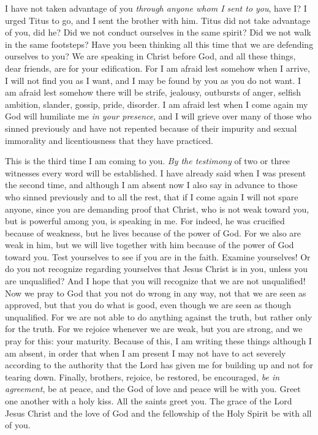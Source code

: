 \begin{biblechapter}
\verse I have not taken advantage of you \textit{through anyone whom I sent to you}, have I?
\verse I urged Titus to go, and I sent the brother with him. Titus did not take advantage of you, did he? Did we not conduct ourselves in the same spirit? Did we not walk in the same footsteps?
\verse Have you been thinking all this time that we are defending ourselves to you? We are speaking in Christ before God, and all these things, dear friends, are for your edification.
\verse For I am afraid lest somehow when I arrive, I will not find you as I want, and I may be found by you as you do not want. I am afraid lest somehow there will be strife, jealousy, outbursts of anger, selfish ambition, slander, gossip, pride, disorder.
\verse I am afraid lest when I come again my God will humiliate me \textit{in your presence}, and I will grieve over many of those who sinned previously and have not repented because of their impurity and sexual immorality and licentiousness that they have practiced.
\end{biblechapter}

\begin{biblechapter} %
 This is the third time I am coming to you. \textit{By the testimony} of two or three witnesses every word will be established.
\verse I have already said when I was present the second time, and although I am absent now I also say in advance to those who sinned previously and to all the rest, that if I come again I will not spare anyone,
\verse since you are demanding proof that Christ, who is not weak toward you, but is powerful among you, is speaking in me.
\verse For indeed, he was crucified because of weakness, but he lives because of the power of God. For we also are weak in him, but we will live together with him because of the power of God toward you.
\verse Test yourselves to see if you are in the faith. Examine yourselves! Or do you not recognize regarding yourselves that Jesus Christ is in you, unless you are unqualified?
\verse And I hope that you will recognize that we are not unqualified!
\verse Now we pray to God that you not do wrong in any way, not that we are seen as approved, but that you do what is good, even though we are seen as though unqualified.
\verse For we are not able to do anything against the truth, but rather only for the truth.
\verse For we rejoice whenever we are weak, but you are strong, and we pray for this: your maturity.
\verse Because of this, I am writing these things although I am absent, in order that when I am present I may not have to act severely according to the authority that the Lord has given me for building up and not for tearing down.
 Finally, brothers, rejoice, be restored, be encouraged, \textit{be in agreement}, be at peace, and the God of love and peace will be with you.
\verse Greet one another with a holy kiss. All the saints greet you.
\verse The grace of the Lord Jesus Christ and the love of God and the fellowship of the Holy Spirit be with all of you.
\end{biblechapter}


